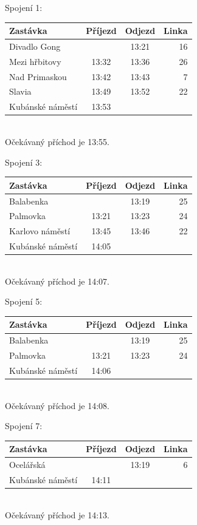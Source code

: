 Spojení 1:\\[2mm]
\begin{tabular}{|l|c|c|r|}\hline
{\bf Zastávka}&{\bf Příjezd}&{\bf Odjezd}&{\bf Linka}\\\hline
Divadlo Gong&&13:21&16\\\hline
Mezi hřbitovy&13:32&13:36&26\\\hline
Nad Primaskou&13:42&13:43&7\\\hline
Slavia&13:49&13:52&22\\\hline
Kubánské náměstí&13:53&&\\\hline
\end{tabular}\\[2mm]
Očekávaný příchod je 13:55.
 

Spojení 3:\\[2mm]
\begin{tabular}{|l|c|c|r|}\hline
{\bf Zastávka}&{\bf Příjezd}&{\bf Odjezd}&{\bf Linka}\\\hline
Balabenka&&13:19&25\\\hline
Palmovka&13:21&13:23&24\\\hline
Karlovo náměstí&13:45&13:46&22\\\hline
Kubánské náměstí&14:05&&\\\hline
\end{tabular}\\[2mm]
Očekávaný příchod je 14:07.
 
Spojení 5:\\[2mm]
\begin{tabular}{|l|c|c|r|}\hline
{\bf Zastávka}&{\bf Příjezd}&{\bf Odjezd}&{\bf Linka}\\\hline
Balabenka&&13:19&25\\\hline
Palmovka&13:21&13:23&24\\\hline
Kubánské náměstí&14:06&&\\\hline
\end{tabular}\\[2mm]
Očekávaný příchod je 14:08.
 
Spojení 7:\\[2mm]
\begin{tabular}{|l|c|c|r|}\hline
{\bf Zastávka}&{\bf Příjezd}&{\bf Odjezd}&{\bf Linka}\\\hline
Ocelářská&&13:19&6\\\hline
Kubánské náměstí&14:11&&\\\hline
\end{tabular}\\[2mm]
Očekávaný příchod je 14:13. 

